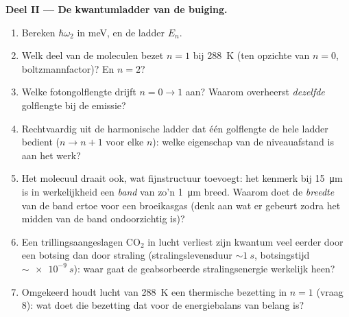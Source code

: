 \begin{problem}
\medskip\noindent\textbf{Deel II --- De kwantumladder van de buiging.}
\begin{enumerate}[resume]
  \item Bereken $\hbar\omega_2$ in meV, en de ladder $E_n$.
  \item Welk deel van de moleculen bezet $n = 1$ bij \qty{288}{K} (ten
        opzichte van $n = 0$, boltzmannfactor)? En $n = 2$?
  \item Welke fotongolflengte drijft $n = 0 \to 1$ aan? Waarom
        overheerst \emph{dezelfde} golflengte bij de emissie?
  \item Rechtvaardig uit de harmonische ladder dat één golflengte de hele
        ladder bedient ($n \to n + 1$ voor elke $n$): welke eigenschap van
        de niveauafstand is aan het werk?
  \item Het molecuul draait ook, wat fijnstructuur toevoegt: het kenmerk
        bij \qty{15}{\micro m} is in werkelijkheid een \emph{band} van
        zo'n \qty{1}{\micro m} breed. Waarom doet de \emph{breedte} van de
        band ertoe voor een broeikasgas (denk aan wat er gebeurt zodra het
        midden van de band ondoorzichtig is)?
  \item Een trillingsaangeslagen CO$_2$ in lucht verliest zijn kwantum
        veel eerder door een botsing dan door straling (stralingslevensduur
        $\sim\qty{1}{s}$, botsingstijd $\sim\qty{e-9}{s}$): waar gaat de
        geabsorbeerde stralingsenergie werkelijk heen?
  \item Omgekeerd houdt lucht van \qty{288}{K} een thermische bezetting
        in $n = 1$ (vraag 8): wat doet die bezetting dat voor de
        energiebalans van belang is?
\end{enumerate}


\end{problem}
